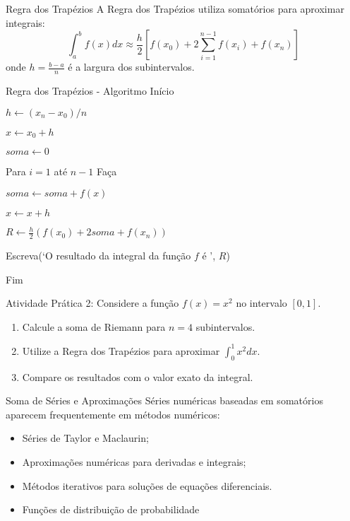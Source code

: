 \documentclass{beamer}
\begin{document}
\begin{frame}{Regra dos Trapézios}
    A Regra dos Trapézios utiliza somatórios para aproximar integrais:
    \[
        \int_{a}^{b} f(x) dx \approx 
        \frac{h}{2} [f(x_0)+2\sum_{i=1}^{n-1} f(x_i) + f(x_n)]
    \]
    onde \( h = \frac{b-a}{n} \) é a largura dos subintervalos.
\end{frame}


\begin{frame}{Regra dos Trapézios - Algoritmo}
Início

\hspace{0.5cm} $h \leftarrow (x_n - x_0) / n$

\hspace{0.5cm} $x \leftarrow x_0 + h$

\hspace{0.5cm} $soma \leftarrow 0$

\hspace{0.5cm} Para $i = 1$ até $n - 1$ Faça

\hspace{1.3cm} $soma \leftarrow soma + f(x)$

\hspace{1.3cm} $x \leftarrow x + h$

\hspace{0.5cm} $R \leftarrow \frac{h}{2} \left(f(x_0)  + 2soma + f(x_n) \right)$

Escreva(‘O resultado da integral da função $f$ é ’, $R$)

Fim
\end{frame}


\begin{frame}{Atividade Prática 2:}
    Considere a função \( f(x) = x^2 \) no intervalo \([0,1]\).
    \begin{enumerate}
        \item Calcule a soma de Riemann para \( n = 4 \) subintervalos.
        \item Utilize a Regra dos Trapézios para aproximar \( \int_{0}^{1} x^2 dx \).
        \item Compare os resultados com o valor exato da integral.
    \end{enumerate}
\end{frame}


\begin{frame}{Soma de Séries e Aproximações}
    Séries numéricas baseadas em somatórios aparecem frequentemente em métodos numéricos:
    \begin{itemize}
        \item Séries de Taylor e Maclaurin;
        \item Aproximações numéricas para derivadas e integrais;
        \item Métodos iterativos para soluções de equações diferenciais.
        \item Funções de distribuição de probabilidade
    \end{itemize}
\end{frame}
\end{document}
